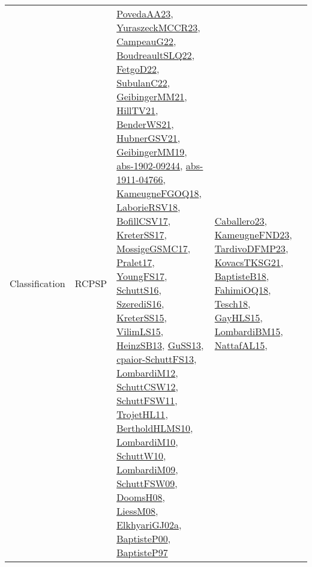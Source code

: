 {\begin{longtable}{lp{3cm}>{\raggedright}p{6cm}>{\raggedright}p{6cm}p{8cm}}
Classification & RCPSP & \href{papers/PovedaAA23.pdf}{PovedaAA23}\cite{PovedaAA23}, \href{articles/YuraszeckMCCR23.pdf}{YuraszeckMCCR23}\cite{YuraszeckMCCR23}, \href{articles/CampeauG22.pdf}{CampeauG22}\cite{CampeauG22}, \href{papers/BoudreaultSLQ22.pdf}{BoudreaultSLQ22}\cite{BoudreaultSLQ22}, \href{articles/FetgoD22.pdf}{FetgoD22}\cite{FetgoD22}, \href{articles/SubulanC22.pdf}{SubulanC22}\cite{SubulanC22}, \href{papers/GeibingerMM21.pdf}{GeibingerMM21}\cite{GeibingerMM21}, \href{papers/HillTV21.pdf}{HillTV21}\cite{HillTV21}, \href{papers/BenderWS21.pdf}{BenderWS21}\cite{BenderWS21}, \href{articles/HubnerGSV21.pdf}{HubnerGSV21}\cite{HubnerGSV21}, \href{papers/GeibingerMM19.pdf}{GeibingerMM19}\cite{GeibingerMM19}, \href{articles/abs-1902-09244.pdf}{abs-1902-09244}\cite{abs-1902-09244}, \href{articles/abs-1911-04766.pdf}{abs-1911-04766}\cite{abs-1911-04766}, \href{papers/KameugneFGOQ18.pdf}{KameugneFGOQ18}\cite{KameugneFGOQ18}, \href{articles/LaborieRSV18.pdf}{LaborieRSV18}\cite{LaborieRSV18}, \href{papers/BofillCSV17.pdf}{BofillCSV17}\cite{BofillCSV17}, \href{articles/KreterSS17.pdf}{KreterSS17}\cite{KreterSS17}, \href{papers/MossigeGSMC17.pdf}{MossigeGSMC17}\cite{MossigeGSMC17}, \href{papers/Pralet17.pdf}{Pralet17}\cite{Pralet17}, \href{papers/YoungFS17.pdf}{YoungFS17}\cite{YoungFS17}, \href{papers/SchuttS16.pdf}{SchuttS16}\cite{SchuttS16}, \href{papers/SzerediS16.pdf}{SzerediS16}\cite{SzerediS16}, \href{papers/KreterSS15.pdf}{KreterSS15}\cite{KreterSS15}, \href{papers/VilimLS15.pdf}{VilimLS15}\cite{VilimLS15}, \href{articles/HeinzSB13.pdf}{HeinzSB13}\cite{HeinzSB13}, \href{papers/GuSS13.pdf}{GuSS13}\cite{GuSS13}, \href{papers/cpaior-SchuttFS13.pdf}{cpaior-SchuttFS13}\cite{cpaior-SchuttFS13}, \href{articles/LombardiM12.pdf}{LombardiM12}\cite{LombardiM12}, \href{papers/SchuttCSW12.pdf}{SchuttCSW12}\cite{SchuttCSW12}, \href{articles/SchuttFSW11.pdf}{SchuttFSW11}\cite{SchuttFSW11}, \href{articles/TrojetHL11.pdf}{TrojetHL11}\cite{TrojetHL11}, \href{papers/BertholdHLMS10.pdf}{BertholdHLMS10}\cite{BertholdHLMS10}, \href{papers/LombardiM10.pdf}{LombardiM10}\cite{LombardiM10}, \href{papers/SchuttW10.pdf}{SchuttW10}\cite{SchuttW10}, \href{papers/LombardiM09.pdf}{LombardiM09}\cite{LombardiM09}, \href{papers/SchuttFSW09.pdf}{SchuttFSW09}\cite{SchuttFSW09}, \href{papers/DoomsH08.pdf}{DoomsH08}\cite{DoomsH08}, \href{articles/LiessM08.pdf}{LiessM08}\cite{LiessM08}, \href{papers/ElkhyariGJ02a.pdf}{ElkhyariGJ02a}\cite{ElkhyariGJ02a}, \href{articles/BaptisteP00.pdf}{BaptisteP00}\cite{BaptisteP00}, \href{papers/BaptisteP97.pdf}{BaptisteP97}\cite{BaptisteP97} & \href{articles/Caballero23.pdf}{Caballero23}\cite{Caballero23}, \href{papers/KameugneFND23.pdf}{KameugneFND23}\cite{KameugneFND23}, \href{papers/TardivoDFMP23.pdf}{TardivoDFMP23}\cite{TardivoDFMP23}, \href{papers/KovacsTKSG21.pdf}{KovacsTKSG21}\cite{KovacsTKSG21}, \href{articles/BaptisteB18.pdf}{BaptisteB18}\cite{BaptisteB18}, \href{articles/FahimiOQ18.pdf}{FahimiOQ18}\cite{FahimiOQ18}, \href{papers/Tesch18.pdf}{Tesch18}\cite{Tesch18}, \href{papers/GayHLS15.pdf}{GayHLS15}\cite{GayHLS15}, \href{papers/LombardiBM15.pdf}{LombardiBM15}\cite{LombardiBM15}, \href{articles/NattafAL15.pdf}{NattafAL15}\cite{NattafAL15}, 
\end{longtable}}
